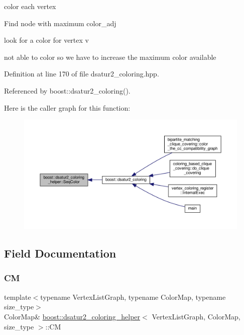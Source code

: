 color each vertex

Find node with maximum color\+\_\+adj

look for a color for vertex v

not able to color so we have to increase the maximum color available 

Definition at line 170 of file dsatur2\+\_\+coloring.\+hpp.



Referenced by boost\+::dsatur2\+\_\+coloring().

Here is the caller graph for this function\+:
\nopagebreak
\begin{figure}[H]
\begin{center}
\leavevmode
\includegraphics[width=350pt]{dd/dbc/classboost_1_1dsatur2__coloring__helper_a0abb8144cff9aa7d05b8bad12b84158c_icgraph}
\end{center}
\end{figure}


\subsection{Field Documentation}
\mbox{\label{classboost_1_1dsatur2__coloring__helper_ab4e5cdc45d0e2579f3a43ed1464e6983}} 
\subsubsection{\texorpdfstring{CM}{CM}}
{\footnotesize\ttfamily template$<$typename Vertex\+List\+Graph, typename Color\+Map, typename size\+\_\+type$>$ \\
Color\+Map\& \hyperlink{classboost_1_1dsatur2__coloring__helper}{boost\+::dsatur2\+\_\+coloring\+\_\+helper}$<$ Vertex\+List\+Graph, Color\+Map, size\+\_\+type $>$\+::CM\hspace{0.3cm}{\ttfamily [private]}}



